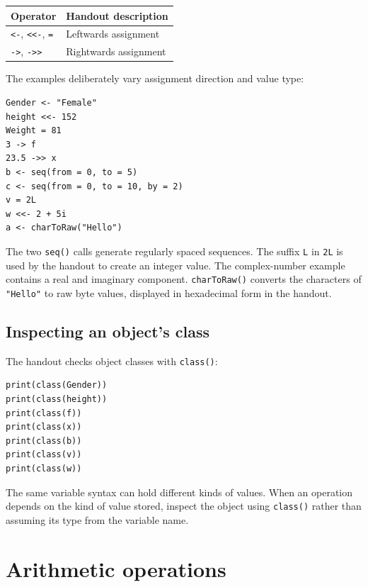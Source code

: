 \begin{dstable}
\begin{tabularx}{\linewidth}{@{}p{3.3cm}X@{}}
\toprule
\rowcolor{DSPaleBlue!92}
Operator & Handout description \\
\midrule
\texttt{<-}, \texttt{<<-}, \texttt{=} & Leftwards assignment \\
\texttt{->}, \texttt{->>} & Rightwards assignment \\
\bottomrule
\end{tabularx}
\end{dstable}

The examples deliberately vary assignment direction and value type:

\begin{lstlisting}[style=dsr]
Gender <- "Female"
height <<- 152
Weight = 81
3 -> f
23.5 ->> x
b <- seq(from = 0, to = 5)
c <- seq(from = 0, to = 10, by = 2)
v = 2L
w <<- 2 + 5i
a <- charToRaw("Hello")
\end{lstlisting}

The two \texttt{seq()} calls generate regularly spaced sequences. The suffix \texttt{L} in \texttt{2L} is used by the handout to create an integer value. The complex-number example contains a real and imaginary component. \texttt{charToRaw()} converts the characters of \texttt{"Hello"} to raw byte values, displayed in hexadecimal form in the handout.

\subsection{Inspecting an object's class}

The handout checks object classes with \texttt{class()}:

\begin{lstlisting}[style=dsr]
print(class(Gender))
print(class(height))
print(class(f))
print(class(x))
print(class(b))
print(class(v))
print(class(w))
\end{lstlisting}

\begin{keyidea}
The same variable syntax can hold different kinds of values. When an operation depends on the kind of value stored, inspect the object using \texttt{class()} rather than assuming its type from the variable name.
\end{keyidea}

\section{Arithmetic operations}

